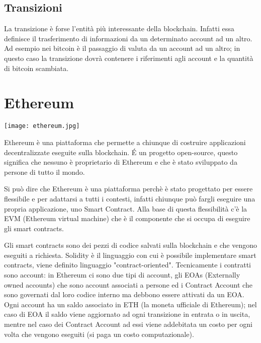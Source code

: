 \subsection{Transizioni}
La transizione è forse l'entità più interessante della blockchain. Infatti essa definisce il trasferimento di informazioni da un determinato account ad un altro. Ad esempio nei bitcoin è il passaggio di valuta da un account ad un altro; in questo caso la transizione dovrà contenere i riferimenti agli account e la quantità di bitcoin scambiata.


\section{Ethereum}

\begin{center}
    \texttt{[image: ethereum.jpg]}
\end{center}

Ethereum è una piattaforma che permette a chiunque di costruire applicazioni decentralizzate eseguite sulla blockchain.
\'E un progetto open-source, questo significa che nessuno è proprietario di Ethereum e che è stato sviluppato da persone di tutto il mondo.

\vspace{0.5cm}

Si può dire che Ethereum è una piattaforma perchè è stato progettato per essere flessibile e per adattarsi a tutti i contesti, infatti chiunque può fargli eseguire una propria applicazione, uno Smart Contract.
Alla base di questa flessibilità c'è la EVM (Ethereum virtual machine) che è il componente che si occupa di eseguire gli smart contracts.

\vspace{0.5cm}

Gli smart contracts sono dei pezzi di codice salvati sulla blockchain e che vengono eseguiti a richiesta. 
Solidity è il linguaggio con cui è possibile implementare smart contracts, viene definito linguaggio "contract-oriented".
Tecnicamente i contratti sono account: in Ethereum ci sono due tipi di account, gli EOAs (Externally owned accounts) che sono account associati a persone ed i Contract Account che sono governati dal loro codice interno ma debbono essere attivati da un EOA.
Ogni account ha un saldo associato in ETH (la moneta ufficiale di Ethereum); nel caso di EOA il saldo viene aggiornato ad ogni transizione in entrata o in uscita, mentre nel caso dei Contract Account ad essi viene addebitata un costo per ogni volta che vengono eseguiti (si paga un costo computazionale).

